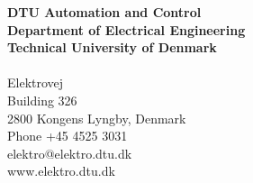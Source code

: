 \thispagestyle{empty} %
\frieze
\vspace*{\fill}
\noindent
\sffamily
\scriptsize
\textbf{DTU Automation and Control}\\
\textbf{Department of Electrical Engineering}\\
\textbf{Technical University of Denmark}\\
\\
Elektrovej\\
Building 326\\
2800 Kongens Lyngby, Denmark\\
Phone +45 4525 3031\\
elektro@elektro.dtu.dk\\
www.elektro.dtu.dk\\
\normalsize
\normalfont
\vspace*{2.5cm}
